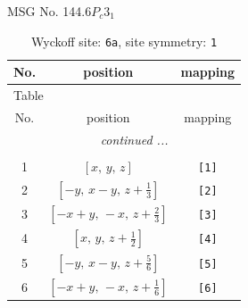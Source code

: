 \documentclass[fleqn,8pt]{jsarticle}
\begin{document}
\setcounter{MaxMatrixCols}{32}

\renewcommand{\tablename}{Table~}
\renewcommand{\figurename}{Figure~}
\begin{center}
\LARGE
MSG No. 144.6\quad$P_{c}3_{1}$
\end{center}
\renewcommand{\arraystretch}{1.2}
\begin{longtable}{ccc}
\caption{Wyckoff site: {\tt 6a}, site symmetry: {\tt 1}}
 \\
 \hline \hline
No. & position & mapping \\ \hline \endfirsthead

\multicolumn{2}{l}{\tablename\ \thetable{}} \\
 \hline \hline
No. & position & mapping \\ \hline \endhead

 \hline \hline
\multicolumn{2}{r}{\footnotesize\it continued ...} \\ \endfoot

 \hline \hline
\multicolumn{2}{r}{} \\ \endlastfoot

1 & $\left[ x,\, y,\, z \right]$ & {\tt [1]} \\ \hline
2 & $\left[ - y,\, x - y,\, z + \frac{1}{3} \right]$ & {\tt [2]} \\ \hline
3 & $\left[ - x + y,\, - x,\, z + \frac{2}{3} \right]$ & {\tt [3]} \\ \hline
4 & $\left[ x,\, y,\, z + \frac{1}{2} \right]$ & {\tt [4]} \\ \hline
5 & $\left[ - y,\, x - y,\, z + \frac{5}{6} \right]$ & {\tt [5]} \\ \hline
6 & $\left[ - x + y,\, - x,\, z + \frac{1}{6} \right]$ & {\tt [6]} \\
\end{longtable}
\end{document}

